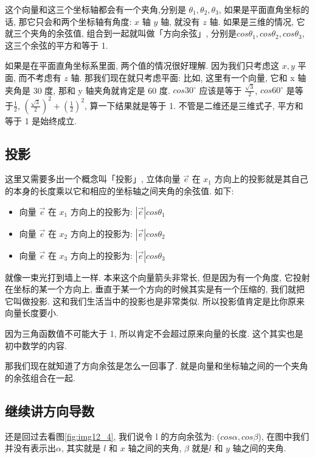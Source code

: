 这个向量和这三个坐标轴都会有一个夹角,分别是 $\theta_1, \theta_2, \theta_3$, 如果是平面直角坐标的话, 那它只会和两个坐标轴有角度: $x$ 轴 $y$ 轴, 就没有 $z$ 轴. 如果是三维的情况, 它就三个夹角的余弦值, 组合到一起就叫做「方向余弦」, 分别是$cos \theta_1, cos \theta_2, cos \theta_3$, 这三个余弦的平方和等于 1. 

如果是在平面直角坐标系里面, 两个值的情况很好理解. 因为我们只考虑这 $x, y$ 平面, 而不考虑有 $z$ 轴. 那我们现在就只考虑平面: 比如, 这里有一个向量, 它和 x 轴夹角是 30 度, 那和 y 轴夹角就肯定是 60 度. $cos30^\circ$ 应该是等于 $\frac {\sqrt 3}{2}$, $cos 60^\circ$ 是等于$\frac{1}{2}$, $(\frac{\sqrt 3}{2})^2 + (\frac{1}{2})^2$, 算一下结果就是等于 1. 不管是二维还是三维式子, 平方和等于 1 是始终成立. 

\subsection{投影}

这里又需要多出一个概念叫「投影」, 立体向量 $\vec e$ 在 $x_1$ 方向上的投影就是其自己的本身的长度乘以它和相应的坐标轴之间夹角的余弦值. 如下: 

\begin{itemize}
  \item 向量 $\vec e$ 在 $x_1$ 方向上的投影为: $|\vec e| cos \theta_1$ 
  \item 向量 $\vec e$ 在 $x_2$ 方向上的投影为: $|\vec e| cos \theta_2$ 
  \item 向量 $\vec e$ 在 $x_3$ 方向上的投影为: $|\vec e| cos \theta_3$ 
\end{itemize}

就像一束光打到墙上一样. 本来这个向量箭头非常长, 但是因为有一个角度, 它投射在坐标的某一个方向上, 垂直于某一个方向的时候其实是有一个压缩的, 我们就把它叫做投影. 这和我们生活当中的投影也是非常类似. 所以投影值肯定是比你原来向量长度要小. 

因为三角函数值不可能大于 1, 所以肯定不会超过原来向量的长度. 这个其实也是初中数学的内容. 

那我们现在就知道了方向余弦是怎么一回事了. 就是向量和坐标轴之间的一个夹角的余弦组合在一起. 

\subsection{继续讲方向导数}

还是回过去看图\ref{fig:img12_4}, 我们说令 l 的方向余弦为: ($cos \alpha , cos \beta$), 在图中我们并没有表示出$\alpha$, 其实就是 $l$ 和 $x$ 轴之间的夹角, $\beta$ 就是$l$ 和 $y$ 轴之间的夹角. 

